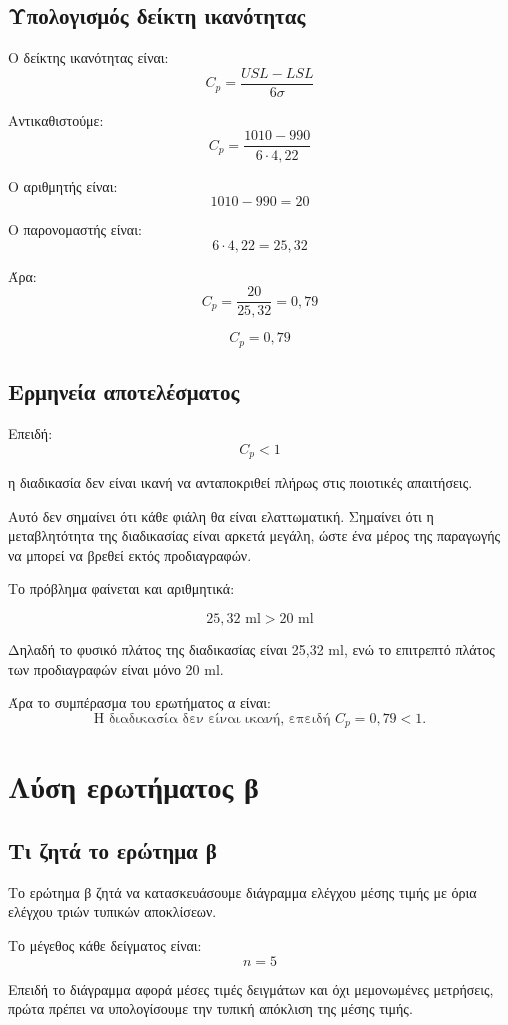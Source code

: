 \documentclass[12pt,a4paper]{article}
\begin{document}
\subsection{Υπολογισμός δείκτη ικανότητας}

Ο δείκτης ικανότητας είναι:
\[
C_p=\frac{USL-LSL}{6\sigma}
\]

Αντικαθιστούμε:
\[
C_p=\frac{1010-990}{6\cdot4{,}22}
\]

Ο αριθμητής είναι:
\[
1010-990=20
\]

Ο παρονομαστής είναι:
\[
6\cdot4{,}22=25{,}32
\]

Άρα:
\[
C_p=\frac{20}{25{,}32}=0{,}79
\]

\[
\boxed{C_p=0{,}79}
\]

\subsection{Ερμηνεία αποτελέσματος}

Επειδή:
\[
C_p<1
\]

η διαδικασία δεν είναι ικανή να ανταποκριθεί πλήρως στις ποιοτικές απαιτήσεις.

Αυτό δεν σημαίνει ότι κάθε φιάλη θα είναι ελαττωματική. Σημαίνει ότι η μεταβλητότητα της διαδικασίας είναι αρκετά μεγάλη, ώστε ένα μέρος της παραγωγής να μπορεί να βρεθεί εκτός προδιαγραφών.

Το πρόβλημα φαίνεται και αριθμητικά:

\[
25{,}32 \text{ ml} > 20 \text{ ml}
\]

Δηλαδή το φυσικό πλάτος της διαδικασίας είναι 25,32 ml, ενώ το επιτρεπτό πλάτος των προδιαγραφών είναι μόνο 20 ml.

Άρα το συμπέρασμα του ερωτήματος α είναι:
\[
\boxed{\text{Η διαδικασία δεν είναι ικανή, επειδή } C_p=0{,}79<1.}
\]

\section{Λύση ερωτήματος β}

\subsection{Τι ζητά το ερώτημα β}

Το ερώτημα β ζητά να κατασκευάσουμε διάγραμμα ελέγχου μέσης τιμής με όρια ελέγχου τριών τυπικών αποκλίσεων.

Το μέγεθος κάθε δείγματος είναι:
\[
n=5
\]

Επειδή το διάγραμμα αφορά μέσες τιμές δειγμάτων και όχι μεμονωμένες μετρήσεις, πρώτα πρέπει να υπολογίσουμε την τυπική απόκλιση της μέσης τιμής.
\end{document}
